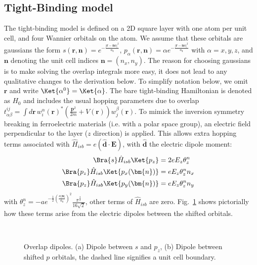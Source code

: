 \subsection{Tight-Binding model}
The tight-binding model is defined on a 2D square layer with one atom per unit cell, and four Wannier orbitals on the atom. We assume that these orbitals are gaussians the form $s(\bm{r}, \bm{n}) = e^{-\frac{|\bm{r}-\bm{n}a|^2}{a_0}}$, $p_\alpha(\bm{r}, \bm{n}) = \alpha e^{-\frac{|\bm{r}-\bm{n}a|^2}{a_0}}$ with $\alpha = x, y, z$, and $\bm{n}$ denoting the unit cell indices $\bm{n} = (n_x, n_y)$.
The reason for choosing gaussians is to make solving the overlap integrals more easy, it does not lead to any qualitative changes to the derivation below.
To simplify notation below, we omit $\bm{r}$ and write $\Ket{\alpha^0} = \Ket{\alpha}$.
The bare tight-binding Hamiltonian is denoted as $\hat{H}_0$ and includes the usual hopping parameters due to overlap $t_{\alpha\beta}^{ij} = \int d\mathbf{r} \,w^{\alpha}_i(\mathbf{r})^*(\frac{\mathbf{p}^2}{2m} + V(\bm{r}))w^{\beta}_j(\mathbf{r})$.
To mimick the inversion symmetry breaking in ferroelectric materials (i.e. with a polar space group), an electric field perpendicular to the layer ($z$ direction) is applied.
This allows extra hopping terms associated with $\hat{H}_{isb} = e (\hat{\bm{d}}\cdot \bm{E})$, with $\hat{\bm{d}}$ the electric dipole moment:
\begin{align}
	\label{eq:dipole}
	\Bra{s} \hat{H}_{isb} \Ket{p_z} &= 2 e E_z \theta_z^n\\
	\Bra{p_z} \hat{H}_{isb} \Ket{p_x(\bm{n})} &= e E_z \theta_z^n n_x\\
	\Bra{p_z} \hat{H}_{isb} \Ket{p_y(\bm{n})} &= e E_z \theta_z^n n_y
\end{align}
with $\theta_z^n = -ae^{-\frac{1}{2}\left(\frac{a|\bm{n}|}{a_0}\right)^2}\frac{\pi^{\frac{3}{2}}}{16\sqrt{2}}$, other terms of $\hat{H}_{isb}$ are zero.
Fig.~\ref{fig:overlapdip} shows pictorially how these terms arise from the electric dipoles between the shifted orbitals. 
\begin{figure}[t]
~\centering
{}\caption{\label{fig:overlapdip} Overlap dipoles. (a) Dipole between $s$ and $p_z$, (b) Dipole between shifted $p$ orbitals, the dashed line signifies a unit cell boundary.}
\end{figure}

